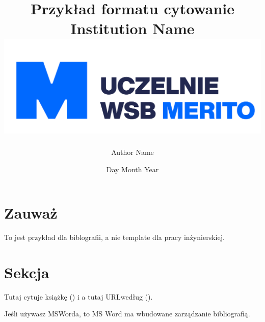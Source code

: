 \documentclass[12pt,a4paper]{report}
\title{
{Przykład formatu cytowanie}\\
{\large Institution Name}\\
{\includegraphics[width=\textwidth]{logomerito.png}}
}
\author{Author Name}
\date{Day Month Year}
\begin{document}
\maketitle

\section*{Zauważ}

To jest przykład dla biblografii, a nie template dla pracy inżynierskiej.

\section*{Sekcja}

Tutaj cytuje książkę (\cite{knuth:1984}) i a tutaj URLwedług (\cite{immigrants2021a}).

Jeśli używasz MSWorda, to MS Word ma wbudowane zarządzanie bibliografią.


\end{document}
